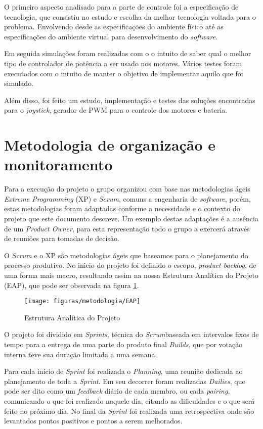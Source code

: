 	O primeiro aspecto analisado para a parte de controle foi a especificação de tecnologia, que consistiu no estudo e escolha da melhor tecnologia voltada para o problema. Envolvendo desde as especificações do ambiente físico até as especificações do ambiente virtual para desenvolvimento do \textit{software}.

	Em seguida simulações foram realizadas com o  o intuito de saber qual o melhor tipo de controlador de potência a ser usado nos motores. Vários testes foram executados com o intuito de manter o objetivo de implementar aquilo que foi simulado.

	Além disso, foi feito um estudo, implementação e testes das soluções encontradas para o \textit{joystick}, gerador de PWM para o controle dos motores e bateria.

\section{Metodologia de organização e monitoramento}

Para a execução do projeto o grupo organizou com base nas metodologias ágeis \textit{Extreme Programming} (XP) e \textit{Scrum}, comuns a engenharia de \textit{software}, porém, estas metodologias foram adaptadas conforme a necessidade e o contexto do projeto que este documento descreve. Um exemplo destas adaptações é a ausência de um \textit{Product Owner}, para esta representação todo o grupo a exercerá através de reuniões para tomadas de decisão.

O \textit{Scrum} e o XP são metodologias ágeis que  baseamos para o planejamento do processo produtivo. No inicio do projeto foi definido o escopo, \textit{product backlog}, de uma forma mais macro, resultando assim na nossa  Estrutura Analítica do Projeto (EAP), que pode ser observada na figura \ref{fig:eap}.

\begin{figure}[!htb]
\centering
  \texttt{[image: figuras/metodologia/EAP]}
\caption{Estrutura Analítica do Projeto}
\label{fig:eap}
\end{figure}

O projeto foi dividido em \textit{Sprints}, técnica do\textit{ Scrum}baseada em intervalos fixos de tempo para a entrega de uma parte do produto final \textit{Builds}, que por votação interna teve sua duração limitada a uma semana.

Para cada início de \textit{Sprint} foi realizada o \textit{Planning}, uma reunião dedicada ao planejamento de toda a \textit{Sprint}. Em seu decorrer foram realizadas \textit{Dailies}, que pode ser dito como um \textit{feedback} diário de cada membro, ou cada \textit{pairing}, comunicando o que foi realizado naquele dia, citando as dificuldades e o que será feito no próximo dia. No final da \textit{Sprint} foi realizada uma retrospectiva onde são levantados pontos positivos e pontos a serem melhorados.


